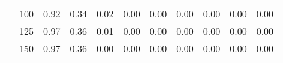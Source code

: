 \begin{table}[t]
\begin{center}
\begin{subtable}[c]{\textwidth}
\begin{center}
\begin{tabular}{rcccccccccc}
                                        & \multicolumn{1}{c|}{100}  & \num{0.92}  & \num{0.34}  & \num{0.02}  & \num{0.00}  & \num{0.00}  & \num{0.00}  & \num{0.00}  & \num{0.00}  & \num{0.00}  \\
                                        & \multicolumn{1}{c|}{125}  & \num{0.97}  & \num{0.36}  & \num{0.01}  & \num{0.00}  & \num{0.00}  & \num{0.00}  & \num{0.00}  & \num{0.00}  & \num{0.00}  \\
                                        & \multicolumn{1}{c|}{150}  & \num{0.97}  & \num{0.36}  & \num{0.00}  & \num{0.00}  & \num{0.00}  & \num{0.00}  & \num{0.00}  & \num{0.00}  & \num{0.00}  \\
                                    \end{tabular}
            \end{center}
        \end{subtable}

        \vspace{5mm}


\end{center}
\end{table}
